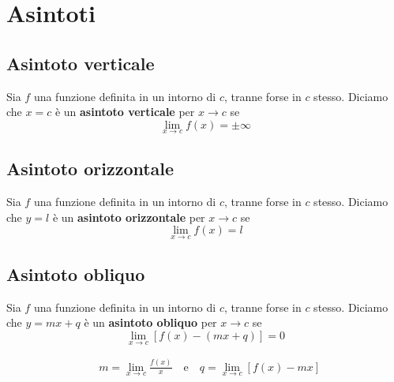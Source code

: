 \documentclass{book}
\begin{document}
\noindent\begin{minipage}{\textwidth}
  \section{Asintoti}
  \begin{definition}
    \subsection{Asintoto verticale}
    Sia \(f\) una funzione definita in un intorno di \(c\), tranne forse in \(c\) stesso. Diciamo che \(x = c\) è un \textbf{asintoto verticale} per \(x \to c\) se
    \[
      \lim_{x \to c} f(x) = \pm \infty
    \]
  \end{definition}
  \begin{definition}
    \subsection{Asintoto orizzontale}
    Sia \(f\) una funzione definita in un intorno di \(c\), tranne forse in \(c\) stesso. Diciamo che \(y = l\) è un \textbf{asintoto orizzontale} per \(x \to c\) se
    \[
      \lim_{x \to c} f(x) = l
    \]
  \end{definition}
  \begin{definition}
    \subsection{Asintoto obliquo}
    Sia \(f\) una funzione definita in un intorno di \(c\), tranne forse in \(c\) stesso. Diciamo che \(y = mx + q\) è un \textbf{asintoto obliquo} per \(x \to c\) se
    \[
      \lim_{x \to c} [f(x) - (mx + q)] = 0
    \]
  \end{definition}
  \begin{proposition}
    \begin{align*}
       & m = \lim_{x \to c} \frac{f(x)}{x} \quad \text{e} \quad q = \lim_{x \to c} [f(x) - mx]
    \end{align*}
  \end{proposition}
\end{minipage}
\end{document}
